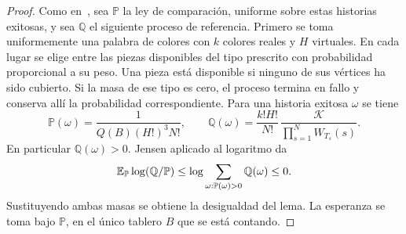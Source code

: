 \begin{proof}
Como en~\cite[Sección~3, Definiciones~3.1 y~3.2]{ultimas}, sea $\mathbb P$ la ley de comparación,
uniforme sobre estas historias exitosas, y sea $\mathbb Q$ el siguiente proceso de referencia. Primero
se toma uniformemente una palabra de colores con $k$ colores reales y $H$ virtuales. En cada
lugar se elige entre las piezas disponibles del tipo prescrito con probabilidad proporcional a su
peso. Una pieza está disponible si ninguno de sus vértices ha sido cubierto. Si la masa de ese tipo es
cero, el proceso termina en fallo y conserva allí la probabilidad correspondiente. Para una historia
exitosa $\omega$ se tiene
\[
 \mathbb P(\omega)=\frac{1}{Q(B)(H!)^3N!},\qquad
 \mathbb Q(\omega)=\frac{k!H!}{N!}\,
             \frac{\mathcal K}{\prod_{s=1}^N W_{T_s}(s)} .
\]
En particular $\mathbb Q(\omega)>0$. Jensen aplicado al logaritmo da
\[
 \mathbb{E}_{\mathbb P}\log(\mathbb Q/\mathbb P)\le\log\sum_{\omega:\mathbb P(\omega)>0}\mathbb Q(\omega)\le0 .
\]
Sustituyendo ambas masas se obtiene la desigualdad del lema. La esperanza se toma bajo $\mathbb P$,
en el
único tablero $B$ que se está contando.
\end{proof}
